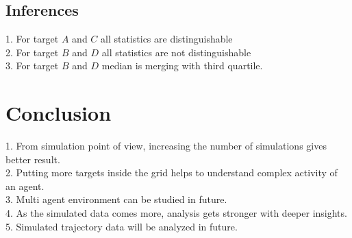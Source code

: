 \documentclass[11pt]{report}
\begin{document}
\subsection{Inferences}
1. For target $A$ and $C$ all statistics are distinguishable\\
2. For target $B$ and $D$ all statistics are not distinguishable\\
3. For target $B$ and $D$ median is merging with third quartile.\\

\section{Conclusion}

1. From simulation point of view, increasing the number of simulations gives better result.\\
2. Putting more targets inside the grid helps to understand  complex activity of an agent.\\
3. Multi agent environment can be studied in future.\\
4. As the simulated data comes more, analysis gets stronger with deeper insights.\\
5. Simulated trajectory data will be analyzed in future.
\end{document}
